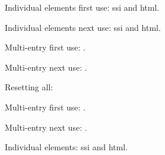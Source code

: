 \documentclass[12pt]{article}
\begin{document}
Individual elements first use: \gls{ssi} and \gls{html}. 

Individual elements next use: \gls{ssi} and \gls{html}. 

Multi-entry first use: . 

Multi-entry next use: . 

Resetting all\glsresetall{}: 

Multi-entry first use: . 

Multi-entry next use: . 

Individual elements: \gls{ssi} and \gls{html}. \printglossaries 
\end{document}
